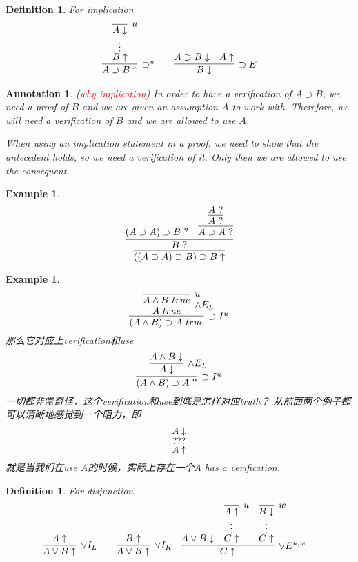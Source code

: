 \documentclass{article}
\theoremstyle{plain}
\newtheorem{example}[theorem]{Example}
\newtheorem{definition}[theorem]{Definition}
\newtheorem{annotation}[theorem]{Annotation}
\theoremstyle{nonumberplain}
\newcommand{\redt}[1]{\textcolor{red}{#1}}
\begin{document}
\begin{definition}
\rm For implication
$$
\begin{aligned}
&\infer[\supset^u]{A \supset B \uparrow}{\deduce[\vdots]{B\uparrow}{\infer[u]{A\downarrow}{}}} &&& \infer[\supset E]{B \downarrow}{A \supset B \downarrow & A \uparrow}
\end{aligned}
$$
\end{definition}

\begin{annotation}
\rm (\redt{why implication}) In order to have a verification of $A \supset B$, we need a proof of $B$ and we are given an assumption $A$ to work with. Therefore, we will need a verification of $B$ and we are allowed to use $A$. 

When using an implication statement in a proof, we need to show that the antecedent holds, so we need a verification of it. Only then we are allowed to use the consequent.
\end{annotation}

\begin{example}\label{use-is-weaker}
\rm
$$
\infer{((A \supset A) \supset B) \supset B \uparrow}{\infer{B ~?}{(A\supset A) \supset B ~? & \infer{A \supset A ~?}{\infer{A~?}{A~?}}}}
$$
\end{example}

\begin{example}\label{early-verification-and-truth}
\rm 
$$
\infer[\supset I^u]{(A \wedge B) \supset A~true}{\infer[\wedge E_L]{A~true}{\infer[u]{A\wedge B~true}{}}}
$$
那么它对应上verification和use
$$
\infer[\supset I^u]{(A \wedge B) \supset A~?}{\infer[\wedge E_L]{A \downarrow}{A \wedge B \downarrow}}
$$
一切都非常奇怪，这个verification和use到底是怎样对应truth？ 从前面两个例子都可以清晰地感觉到一个阻力，即
$$
\deduce[???]{A \uparrow}{A \downarrow}
$$
就是当我们在use $A$的时候，实际上存在一个$A$ has a verification. 
\end{example}


\begin{definition}
\rm For disjunction
$$
\begin{aligned}
&\infer[\vee I_L]{A \vee B \uparrow}{A \uparrow} &&& \infer[\vee I_R]{A \vee B \uparrow}{B \uparrow} &&&  \infer[\vee E^{u,w}]{C \uparrow}{A \vee B \downarrow & \deduce[\vdots]{C\uparrow}{\infer[u]{A\uparrow}{}} & \deduce[\vdots]{C\uparrow}{\infer[w]{B\downarrow}{}}}
\end{aligned}
$$
\end{definition}
\end{document}
